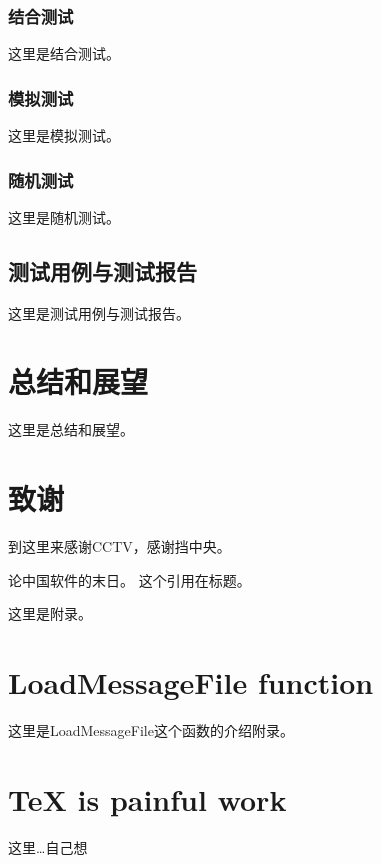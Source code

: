 \documentclass[a4paper]{ecnuthesis}
\begin{document}
\subsubsection{结合测试}
这里是结合测试。

\subsubsection{模拟测试}
这里是模拟测试。

\subsubsection{随机测试}
这里是随机测试。

\subsection{测试用例与测试报告}
这里是测试用例与测试报告。

\section{总结和展望}
这里是总结和展望。

\section{致谢}
到这里来感谢CCTV，感谢挡中央。

\begin{thesisthebibliography}
 论中国软件的末日。
 这个引用在标题。
\end{thesisthebibliography}

\thesisfigureandtableindex

\begin{thesisappendix}
这里是附录。

\section{LoadMessageFile function}
这里是LoadMessageFile这个函数的介绍附录。

\section{\TeX{} is painful work}
这里\dots 自己想

\end{thesisappendix}
\end{document}
